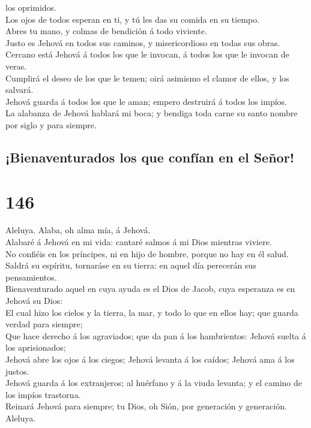 los oprimidos.\\
 Los ojos de todos esperan en ti, y tú les das su comida
en su tiempo.\\
 Abres tu mano, y colmas de bendición á todo viviente.\\
 Justo es Jehová en todos sus caminos, y misericordioso
en todas sus obras.\\
 Cercano está Jehová á todos los que le invocan, á todos
los que le invocan de veras.\\
 Cumplirá el deseo de los que le temen; oirá asimismo el
clamor de ellos, y los salvará.\\
 Jehová guarda á todos los que le aman; empero destruirá
á todos los impíos.\\
 La alabanza de Jehová hablará mi boca; y bendiga toda
carne su santo nombre por siglo y para siempre.

\hypertarget{bienaventurados-los-que-confuxedan-en-el-seuxf1or}{%
\subsection{¡Bienaventurados los que confían en el
Señor!}\label{bienaventurados-los-que-confuxedan-en-el-seuxf1or}}

\hypertarget{section-19-146}{%
\section{146}\label{section-19-146}}

 Aleluya. Alaba, oh alma mía, á Jehová.\\
 Alabaré á Jehová en mi vida: cantaré salmos á mi Dios
mientras viviere.\\
 No confiéis en los príncipes, ni en hijo de hombre,
porque no hay en él salud.\\
 Saldrá su espíritu, tornaráse en su tierra: en aquel día
perecerán sus pensamientos.\\
 Bienaventurado aquel en cuya ayuda es el Dios de Jacob,
cuya esperanza es en Jehová su Dios:\\
 El cual hizo los cielos y la tierra, la mar, y todo lo
que en ellos hay; que guarda verdad para siempre;\\
 Que hace derecho á los agraviados; que da pan á los
hambrientos: Jehová suelta á los aprisionados;\\
 Jehová abre los ojos á los ciegos; Jehová levanta á los
caídos; Jehová ama á los justos.\\
 Jehová guarda á los extranjeros; al huérfano y á la viuda
levanta; y el camino de los impíos trastorna.\\
 Reinará Jehová para siempre; tu Dios, oh Sión, por
generación y generación. Aleluya.

